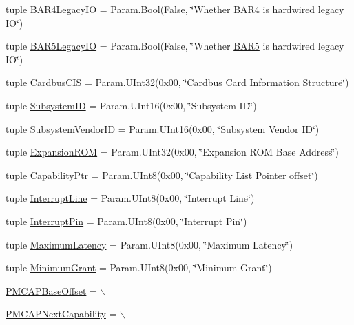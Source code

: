 \begin{DoxyCompactItemize}
\item 
tuple \hyperlink{classPci_1_1PciDevice_a1889f7678ee01aa35fe7794c3fcc5532}{BAR4LegacyIO} = Param.Bool(False, \char`\"{}Whether \hyperlink{classPci_1_1PciDevice_a50a34d2b9855ad231f8b6dab39c0641a}{BAR4} is hardwired legacy IO\char`\"{})
\item 
tuple \hyperlink{classPci_1_1PciDevice_a1b1ce5b4104691adbdac48022f8c3a85}{BAR5LegacyIO} = Param.Bool(False, \char`\"{}Whether \hyperlink{classPci_1_1PciDevice_a9bc605ff9fcc9424477afc81fa73422e}{BAR5} is hardwired legacy IO\char`\"{})
\item 
tuple \hyperlink{classPci_1_1PciDevice_aaab5b5626899d7883cd5f10928a5361c}{CardbusCIS} = Param.UInt32(0x00, \char`\"{}Cardbus Card Information Structure\char`\"{})
\item 
tuple \hyperlink{classPci_1_1PciDevice_abb9500d6e2e6ec75e16a1410a70b0d72}{SubsystemID} = Param.UInt16(0x00, \char`\"{}Subsystem ID\char`\"{})
\item 
tuple \hyperlink{classPci_1_1PciDevice_a562a1b4e663fc1c10e0ee4e50270e43b}{SubsystemVendorID} = Param.UInt16(0x00, \char`\"{}Subsystem Vendor ID\char`\"{})
\item 
tuple \hyperlink{classPci_1_1PciDevice_a6fae934678e80bb655627c43e85de188}{ExpansionROM} = Param.UInt32(0x00, \char`\"{}Expansion ROM Base Address\char`\"{})
\item 
tuple \hyperlink{classPci_1_1PciDevice_abd17d68ce809f43df0fb34c342d84464}{CapabilityPtr} = Param.UInt8(0x00, \char`\"{}Capability List Pointer offset\char`\"{})
\item 
tuple \hyperlink{classPci_1_1PciDevice_abfcd311da14374993f51eece70622ee4}{InterruptLine} = Param.UInt8(0x00, \char`\"{}Interrupt Line\char`\"{})
\item 
tuple \hyperlink{classPci_1_1PciDevice_a5b633242454258f93682fd8b05d934a1}{InterruptPin} = Param.UInt8(0x00, \char`\"{}Interrupt Pin\char`\"{})
\item 
tuple \hyperlink{classPci_1_1PciDevice_a20752dfff7481059cf2d3887436800d1}{MaximumLatency} = Param.UInt8(0x00, \char`\"{}Maximum Latency\char`\"{})
\item 
tuple \hyperlink{classPci_1_1PciDevice_a00f14447f8246b8b6a86c550185caddc}{MinimumGrant} = Param.UInt8(0x00, \char`\"{}Minimum Grant\char`\"{})
\item 
\hyperlink{classPci_1_1PciDevice_af76928584582737ee33777f4bdb0ddd5}{PMCAPBaseOffset} = $\backslash$
\item 
\hyperlink{classPci_1_1PciDevice_a0737f1d13a6ea8423232a0b232b6335c}{PMCAPNextCapability} = $\backslash$

\end{DoxyCompactItemize}
